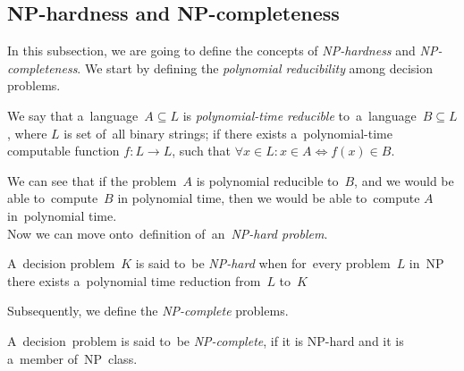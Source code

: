 \subsection{NP-hardness and NP-completeness}
In this subsection, we are going to define the concepts of \textit{NP-hardness} and \textit{NP-completeness}.
We start by defining the \textit{polynomial reducibility} among decision problems.~\cite{Karp, Cook}
\begin{definition}
    We say that a~language~$A \subseteq L$ is \emph{polynomial-time reducible} to~a~language~$B \subseteq L$, where $L$ is set of~all binary strings; if there exists a~polynomial-time computable function $f: L \rightarrow L$, such that $\forall x \in L: x \in A \iff f(x) \in B$.
\end{definition}
We can see that if the problem~$A$ is polynomial reducible to~$B$, and we would be able to~compute~$B$ in polynomial time, then we would be able to~compute $A$ in~polynomial time. \\
Now we can move onto~definition of~an~\textit{NP-hard problem}.
\begin{definition}[NP-hardness]
    A~decision problem~$K$ is said to~be \emph{NP-hard} when for~every problem~$L$ in~NP there exists a~polynomial time reduction from~$L$ to~$K$
\end{definition}
Subsequently, we define the \textit{NP-complete} problems.
\begin{definition}[NP-completeness]
    A~decision~problem is said to~be \emph{NP-complete}, if it is NP-hard and it is a~member of~NP~class.
\end{definition}
